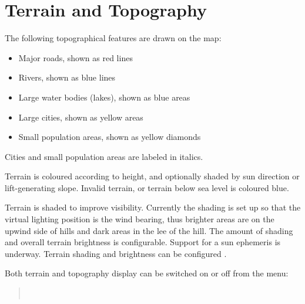 \section{Terrain and Topography}\label{sec:terrain_topo}

The following topographical features are drawn on the map:
\begin{itemize}
\item Major roads, shown as red lines
\item Rivers, shown as blue lines
\item Large water bodies (lakes), shown as blue areas
\item Large cities, shown as yellow areas
\item Small population areas, shown as yellow diamonds
\end{itemize}
Cities and small population areas are labeled in italics.

Terrain is coloured according to height, and optionally shaded by sun
direction or lift-generating slope.  Invalid terrain, or terrain below
sea level is coloured blue.

Terrain is shaded to improve visibility.  Currently the shading
is set up so that the virtual lighting position is the wind bearing,
thus brighter areas are on the upwind side of hills and dark areas in
the lee of the hill.  The amount of shading and overall terrain
brightness is configurable.  Support for a sun ephemeris is underway.
Terrain shading and brightness can be configured .

Both terrain and topography display can be switched on or off from the
menu:
\begin{quote}
\blink{} \\
\blink{}
\end{quote}

